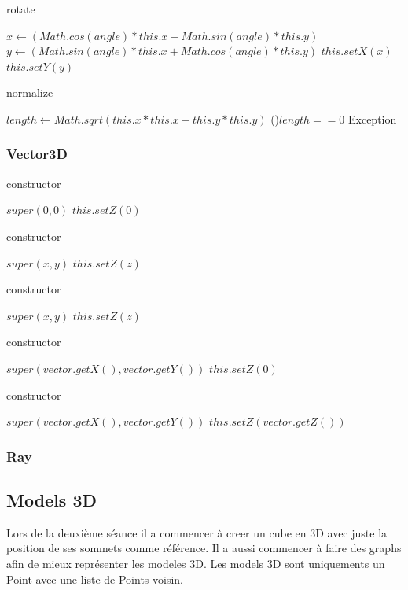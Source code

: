 \documentclass[a4paper,12pt]{article} %
\begin{document}
\begin{algorithm}
    \caption{rotate}\label{Vector2D:rotate}
    $x \gets (Math.cos(angle) * this.x - Math.sin(angle) * this.y)$\;
    $y \gets (Math.sin(angle) * this.x + Math.cos(angle) * this.y)$\;
    $this.setX(x)$\;
    $this.setY(y)$\;
\end{algorithm}

\begin{algorithm}
    \caption{normalize}\label{Vector2D:normalize}
    $length \gets Math.sqrt(this.x * this.x + this.y * this.y)$\;
    \If(){$length == 0$}{
        Exception
    }
    \;
\end{algorithm}

\newpage

\subsubsection{Vector3D}

\begin{algorithm}
    \caption{constructor}\label{Vector3D:constructor1}
    $super(0, 0)$\;
    $this.setZ(0)$\;
\end{algorithm}

\begin{algorithm}
    \caption{constructor}\label{Vector3D:constructor2}
    $super(x, y)$\;
    $this.setZ(z)$\;
\end{algorithm}

\begin{algorithm}
    \caption{constructor}\label{Vector3D:constructor2}
    $super(x, y)$\;
    $this.setZ(z)$\;
\end{algorithm}

\begin{algorithm}
    \caption{constructor}\label{Vector3D:constructor3}
    $super(vector.getX(), vector.getY())$\;
    $this.setZ(0)$\;
\end{algorithm}

\begin{algorithm}
    \caption{constructor}\label{Vector3D:constructor4}
    $super(vector.getX(), vector.getY())$\;
    $this.setZ(vector.getZ())$\;
\end{algorithm}

\subsubsection{Ray}

\subsection{Models 3D}

Lors de la deuxième séance il a commencer à creer un cube en 3D avec juste la position de ses sommets comme référence.
Il a aussi commencer à faire des graphs afin de mieux représenter les modeles 3D.
Les models 3D sont uniquements un Point avec une liste de Points voisin.
\end{document}
